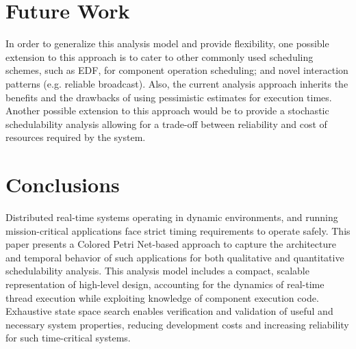 
\section{Future Work}
\label{sec:Future_Work}

\vspace{-0.1in}
 
In order to generalize this analysis model and provide flexibility, one possible extension to this approach is to cater to other commonly used scheduling schemes, such as EDF, for component operation scheduling; and novel interaction patterns (e.g. reliable broadcast). Also, the current analysis approach inherits the benefits and the drawbacks of using pessimistic estimates for execution times. Another possible extension to this approach would be to provide a stochastic schedulability analysis allowing for a trade-off between reliability and cost of resources required by the system. 

\vspace{-0.2in}

\section{Conclusions}
\label{sec:Conclusions}

\vspace{-0.1in}

Distributed real-time systems operating in dynamic environments, and running mission-critical applications face strict timing requirements to operate safely. %
This paper presents a Colored Petri Net-based approach to capture the architecture and temporal behavior of such applications for both qualitative and quantitative schedulability analysis. This analysis model includes a compact, scalable representation of high-level design, accounting for the dynamics of real-time thread execution while exploiting knowledge of component execution code. Exhaustive state space search enables verification and validation of useful and necessary system properties, reducing development costs and increasing reliability for such time-critical systems. 

\vspace{-0.2in}